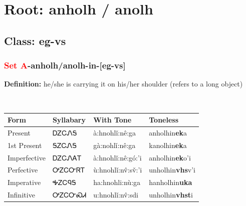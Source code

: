 \needspace{4in}
\section*{Root: anholh / anolh}
\nopagebreak
{}
\needspace{3in}
\subsection*{Class: eg-vs}
\nopagebreak
\needspace{2in}
\subsubsection*{\textcolor{Red}{Set A}{-}\textbf{anholh/anolh}{-}in{-}[eg-vs]}
\nopagebreak
\textbf{Definition: } he/she is carrying it on his/her shoulder (refers to a long object)
\\[0.5em]
\begin{tabularx}{\textwidth}{l X X X}%
\toprule%
\textbf{Form}&\textbf{Syllabary}&\textbf{With Tone}&\textbf{Toneless}\\%
\midrule%
Present&ᎠᏃᏟᏁᎦ&à:hnohlǐ:nê:ga&anholhin\textbf{ek}a\\%
1st Present&ᎦᏃᏟᏁᎦ&gà:nohlǐ:nê:ga&kanolhin\textbf{ek}a\\%
Imperfective&ᎠᏃᏟᏁᎪᎢ&à:hnohlǐ:nê:gó:’i&anholhin\textbf{ek}o'i\\%
Perfective&ᎤᏃᏟᏅᏒᎢ&ù:hnohlǐ:nv̂:sv̌:’i&unholhin\textbf{vhs}v'i\\%
Imperative&ᎭᏃᏟᏄᎦ&ha:hnohli:nù:ga&hanholhin\textbf{uka}\\%
Infinitive&ᎤᏃᏟᏅᏍᏗ&u:hnohlǐ:nv̂:sdi&unholhin\textbf{vhst}i\\%
\bottomrule%
\end{tabularx}
\\[1em]